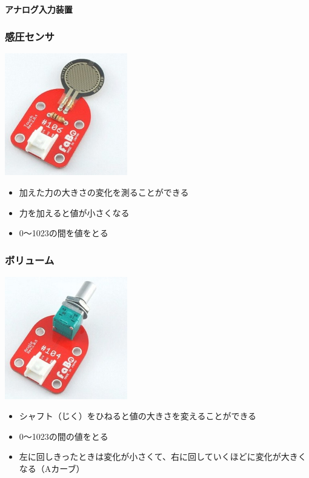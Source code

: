 \begin{frame}[plain]
    \begin{center}
        \vspace{48pt}
        {\huge\bf アナログ入力装置}
    \end{center}
\end{frame}

\begin{frame}
    \frametitle{感圧センサ}
    \begin{center}
        \includegraphics[width=0.4\textwidth]{images/chap05/text05-img021.jpg}
        \begin{itemize}
            \item 加えた力の大きさの変化を測ることができる
            \item 力を加えると値が小さくなる
            \item 0〜1023の間を値をとる
        \end{itemize}
    \end{center}
\end{frame}

\begin{frame}
    \frametitle{ボリューム}
    \begin{center}
        \includegraphics[width=0.4\textwidth]{images/chap05/text05-img022.jpg}
        \begin{itemize}
            \item シャフト（じく）をひねると値の大きさを変えることができる
            \item 0〜1023の間の値をとる
            \item 左に回しきったときは変化が小さくて、右に回していくほどに変化が大きくなる（Aカーブ）
        \end{itemize}
    \end{center}
\end{frame}

